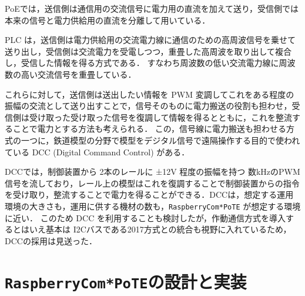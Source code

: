 {%


PoEでは，送信側は通信用の交流信号に電力用の直流を加えて送り，受信側では本来の信号と電力供給用の直流を分離して用いている．

PLC は，送信側は電力供給用の交流電力線に通信のための高周波信号を乗せて送り出し，受信側は交流電力を受電しつつ，重畳した高周波を取り出して複合し，受信した情報を得る方式である．
すなわち周波数の低い交流電力線に周波数の高い交流信号を重畳している．

これらに対して，送信側は送出したい情報を PWM 変調してこれをある程度の振幅の交流として送り出すことで，信号そのものに電力搬送の役割も担わせ，受信側は受け取った受け取った信号を復調して情報を得るとともに，これを整流することで電力とする方法も考えられる．
この，信号線に電力搬送も担わせる方式の一つに，鉄道模型の分野で模型をデジタル信号で遠隔操作する目的で使われている DCC (Digital Command Control) がある\cite{misc:DCC}．


DCCでは，制御装置から 2本のレールに ±12V 程度の振幅を持つ 数kHzのPWM信号を流しており，レール上の模型はこれを復調することで制御装置からの指令を受け取り，整流することで電力を得ることができる．DCCは，想定する運用環境の大きさも，運用に供する機材の数も，{\tt Raspberry\-Com*PoTE} が想定する環境に近い．
このため DCC を利用することも検討したが，作動通信方式を導入するとはいえ基本は I2Cバスである2017方式との統合も視野に入れているため，DCCの採用は見送った．




\section{{\tt Raspberry\-Com*PoTE}の設計と実装}
\label{sec:04design_and_implementation}

}
